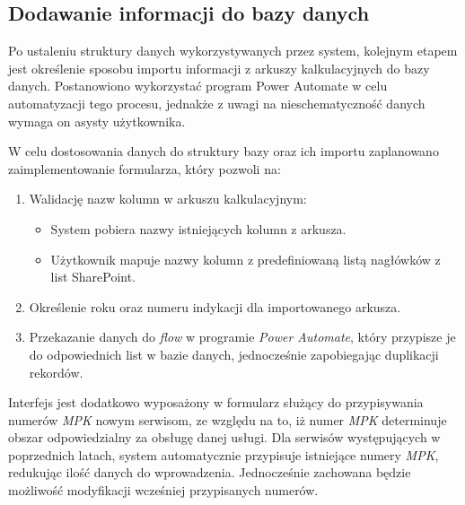 \subsection{Dodawanie informacji do bazy danych}

Po ustaleniu struktury danych wykorzystywanych przez system, kolejnym etapem jest określenie sposobu importu informacji z arkuszy kalkulacyjnych do bazy danych. Postanowiono wykorzystać program Power Automate w celu automatyzacji tego procesu, jednakże z uwagi na nieschematyczność danych wymaga on asysty użytkownika.

W celu dostosowania danych do struktury bazy oraz ich importu zaplanowano zaimplementowanie formularza, który pozwoli na:
\begin{enumerate}
    \item Walidację nazw kolumn w arkuszu kalkulacyjnym:
          \begin{itemize}
              \item System pobiera nazwy istniejących kolumn z arkusza.
              \item Użytkownik mapuje nazwy kolumn z predefiniowaną listą nagłówków z list SharePoint.
          \end{itemize}
    \item Określenie roku oraz numeru indykacji dla importowanego arkusza.
    \item Przekazanie danych do \emph{flow} w programie \emph{Power Automate}, który przypisze je do odpowiednich list w bazie danych, jednocześnie zapobiegając duplikacji rekordów.
\end{enumerate}

\begin{comment}
W celu dostosowania danych do struktury bazy, zaplanowano zaimplementowanie formularza walidacyjnego dla nazw kolumn. System pobiera nazwy istniejących kolumn z arkusza i umożliwia ich mapowanie z wykorzystaniem predefiniowanej listy nagłówków z list SharePoint.

Po uporządkowaniu struktury, użytkownik określa rok oraz numer indykacji dla importowanego arkusza. Następnie dane przekazywane są do \emph{flow} w programie \emph{Power Automate}, który przypisze je do odpowiednich list w bazie danych, jednocześnie zapobiegając duplikacji rekordów.
\end{comment}
Interfejs jest dodatkowo wyposażony w formularz służący do przypisywania numerów \emph{MPK} nowym serwisom, ze względu na to, iż numer \emph{MPK} determinuje obszar odpowiedzialny za obsługę danej usługi. Dla serwisów występujących w poprzednich latach, system automatycznie przypisuje istniejące numery \emph{MPK}, redukując ilość danych do wprowadzenia. Jednocześnie zachowana będzie możliwość modyfikacji wcześniej przypisanych numerów.

